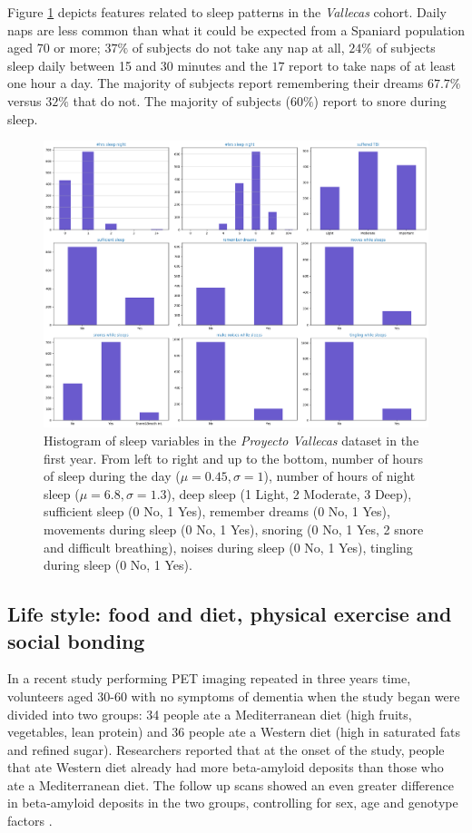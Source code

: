 \documentclass[11pt]{article}
\theoremstyle{definition}
\theoremstyle{remark}
\begin{document}
Figure \ref{fig:sleep} depicts features related to sleep patterns in the \emph{Vallecas} cohort. Daily naps are less common than what it could be expected from a Spaniard population aged 70 or more; $37\%$ of subjects do not take any nap at all, $24\%$ of subjects sleep daily between 15 and 30 minutes and the $17$ report to take naps of at least one hour a day. The majority of subjects report remembering their dreams $67.7\%$ versus $32\%$ that do not. The majority of subjects ($60\%$) report to snore during sleep. 
\begin{figure}[H]
        \centering
        \includegraphics[keepaspectratio, width=\linewidth]{figures/Fig_sleep}
        \caption{Histogram of sleep variables in the \emph{Proyecto Vallecas} dataset in the first year. From left to right and up to the bottom, number of hours of sleep during the day ($\mu=0.45, \sigma=1$), number of hours of night sleep ($\mu=6.8, \sigma=1.3$), deep sleep (1 Light, 2 Moderate, 3 Deep), sufficient sleep (0 No, 1 Yes), remember dreams (0 No, 1 Yes), movements during sleep (0 No, 1 Yes), snoring (0 No, 1 Yes, 2 snore and difficult breathing), noises during sleep (0 No, 1 Yes), tingling during sleep (0 No, 1 Yes).} 
        \label{fig:sleep}
\end{figure}


\subsection{Life style: food and diet, physical exercise and social bonding}
\label{ssse:life}

In a recent study performing PET imaging repeated in three years time, volunteers aged 30-60 with no symptoms of dementia when the study began were divided into two groups: 34 people ate a Mediterranean diet (high fruits, vegetables, lean protein) and 36 people ate a Western diet (high in saturated fats and refined sugar). Researchers reported that at the onset of the study, people that ate Western diet already had more beta-amyloid deposits than those who ate a Mediterranean diet. The follow up scans showed an even greater difference in beta-amyloid deposits in the two groups, controlling for sex, age and genotype factors \cite{berti2018mediterranean}.
\end{document}
